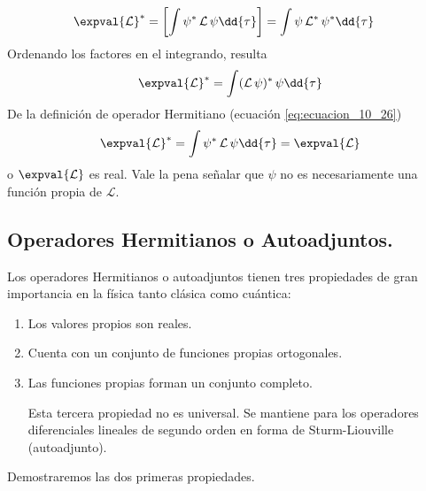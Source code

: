 \begin{align*}
\expval{\mathcal{L}}^{*} &= \left[ \int \psi^{*} \, \mathcal{L} \, \psi \dd{\tau} \right] = \int \psi \, \mathcal{L}^{*} \, \psi^{*} \dd{\tau}
\end{align*}
Ordenando los factores en el integrando, resulta
\begin{align*}
\expval{\mathcal{L}}^{*} = \int (\mathcal{L} \, \psi)^{*} \, \psi \dd{\tau}
\end{align*}
De la definición de operador Hermitiano (ecuación \ref{eq:ecuacion_10_26})
\begin{equation}
\expval{\mathcal{L}}^{*} = \int \psi^{*} \, \mathcal{L} \, \psi \dd{\tau} = \expval{\mathcal{L}} 
\label{eq:ecuacion_10_28b}
\end{equation}
o $\expval{\mathcal{L}}$ es real. Vale la pena señalar que $\psi$ no es necesariamente una función propia de $\mathcal{L}$.
\subsection{Operadores Hermitianos o Autoadjuntos.}
Los operadores Hermitianos o autoadjuntos tienen tres propiedades de gran importancia en la física tanto clásica como cuántica:
\begin{enumerate}
\item Los valores propios son reales.
\item Cuenta con un conjunto de funciones propias ortogonales.
\item Las funciones propias forman un conjunto completo.
\par
Esta tercera propiedad no es universal. Se mantiene para los operadores diferenciales lineales de segundo orden en forma de Sturm-Liouville (autoadjunto).
\end{enumerate}
Demostraremos las dos primeras propiedades.
